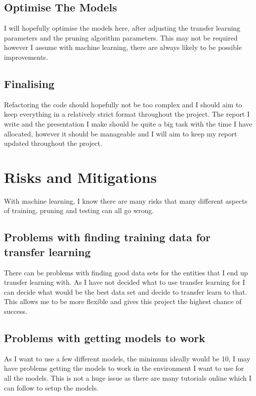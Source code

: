 \documentclass{article}
\begin{document}
\subsection{Optimise The Models}

I will hopefully optimise the models here, after adjusting the transfer learning parameters and the pruning algorithm parameters. This may not be required however I assume with machine learning, there are always likely to be possible improvements.

\subsection{Finalising}

Refactoring the code should hopefully not be too complex and I should aim to keep everything in a relatively strict format throughout the project. The report I write and the presentation I make should be quite a big task with the time I have allocated, however it should be manageable and I will aim to keep my report updated throughout the project.

\pagebreak
\section{Risks and Mitigations}
With machine learning, I know there are many risks that many different aspects of training, pruning and testing can all go wrong.

\subsection{Problems with finding training data for transfer learning}
There can be problems with finding good data sets for the entities that I end up transfer learning with. As I have not decided what to use transfer learning for I can decide what would be the best data set and decide to transfer learn to that. This allows me to be more flexible and gives this project the highest chance of success.

\subsection{Problems with getting models to work}
As I want to use a few different models, the minimum ideally would be 10, I may have problems getting the models to work in the environment I want to use for all the models. This is not a huge issue as there are many tutorials online which I can follow to setup the models.
\end{document}
